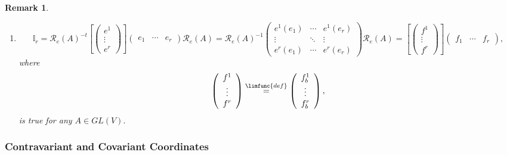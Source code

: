 \documentclass[aps,preprint]{revtex4}
\newtheorem{remark}[theorem]{Remark}
\begin{document}
\begin{remark}
\begin{enumerate}
\item 
\begin{equation}
\mathbb{I}_{r}=\mathcal{R}_{e}\left( A\right) ^{-t}\left[ \left( 
\begin{array}{c}
e^{1} \\ 
\vdots \\ 
e^{r}%
\end{array}%
\right) \right] \left( 
\begin{array}{ccc}
e_{1} & \cdots & e_{r}%
\end{array}%
\right) \mathcal{R}_{e}\left( A\right) =\mathcal{R}_{e}\left( A\right)
^{-1}\left( 
\begin{array}{ccc}
e^{1}\left( e_{1}\right) & \cdots & e^{1}\left( e_{r}\right) \\ 
\vdots & \ddots & \vdots \\ 
e^{r}\left( e_{1}\right) & \cdots & e^{r}\left( e_{r}\right)%
\end{array}%
\right) \mathcal{R}_{e}\left( A\right) =\left[ \left( 
\begin{array}{c}
f^{1} \\ 
\vdots \\ 
f^{r}%
\end{array}%
\right) \right] \left( 
\begin{array}{ccc}
f_{1} & \cdots & f_{r}%
\end{array}%
\right) ,
\end{equation}%
where 
\begin{equation}
\left( 
\begin{array}{c}
f^{1} \\ 
\vdots \\ 
f^{r}%
\end{array}%
\right) \overset{\limfunc{def}}{=}\left( 
\begin{array}{c}
f_{b}^{1} \\ 
\vdots \\ 
f_{b}^{r}%
\end{array}%
\right) ,
\end{equation}%
is true \emph{for any} $A\in GL\left( V\right) .$
\end{enumerate}
\end{remark}

\subsubsection{Contravariant and Covariant Coordinates \label{Contravariant
and Covariant Coordinates}}
\end{document}
